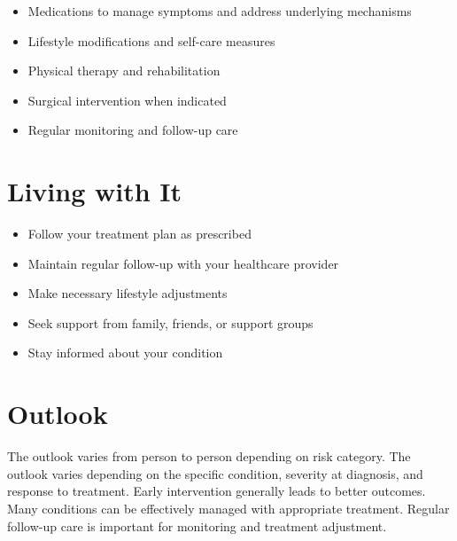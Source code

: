 \begin{itemize}[noitemsep]
  \item Medications to manage symptoms and address underlying mechanisms
  \item Lifestyle modifications and self-care measures
  \item Physical therapy and rehabilitation
  \item Surgical intervention when indicated
  \item Regular monitoring and follow-up care
\end{itemize}
\section{Living with It}
\begin{itemize}[noitemsep]
  \item Follow your treatment plan as prescribed
  \item Maintain regular follow-up with your healthcare provider
  \item Make necessary lifestyle adjustments
  \item Seek support from family, friends, or support groups
  \item Stay informed about your condition
\end{itemize}
\section{Outlook}
The outlook varies from person to person depending on risk category. The outlook varies depending on the specific condition, severity at diagnosis, and response to treatment. Early intervention generally leads to better outcomes. Many conditions can be effectively managed with appropriate treatment. Regular follow-up care is important for monitoring and treatment adjustment.
